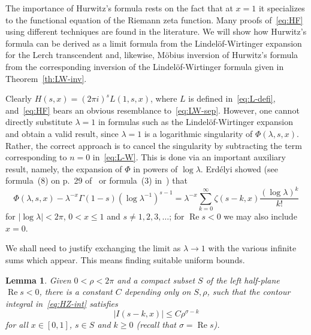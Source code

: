 \documentclass[11pt,a4paper,reqno]{amsart}
\renewcommand{\Re}{\operatorname{Re}}
\theoremstyle{plain}
\newtheorem{lemma}{Lemma}
\theoremstyle{remark}
\numberwithin{equation}{section}
\begin{document}
The importance of Hurwitz's formula rests on the fact that at $x = 1$ it specializes to the functional equation of the Riemann zeta function. Many proofs of~\eqref{eq:HF} using different techniques are found in the literature. We will show how Hurwitz's formula can be derived as a limit formula from the Lindel\"of-Wirtinger expansion for the Lerch transcendent and, likewise, M\"obius inversion of Hurwitz's formula from the corresponding inversion of the Lindel\"of-Wirtinger formula given in Theorem~\ref{th:LW-inv}.

Clearly $H(s,x) = (2\pi i)^{s} L(1,s,x)$, where $L$ is defined in~\eqref{eq:L-defi}, and~\eqref{eq:HF} bears an obvious resemblance to~\eqref{eq:LW-sep}.
However, one cannot directly substitute $\lambda = 1$ in formulas such as the Lindel\"of-Wirtinger expansion and obtain a valid result, since $\lambda = 1$ is a logarithmic singularity of $\Phi(\lambda,s,x)$. Rather, the correct approach is to cancel the singularity by subtracting the term corresponding to $n=0$ in~\eqref{eq:L-W}. This is done via an important auxiliary result, namely, the expansion of $\Phi$ in powers of $\log\lambda$. Erd\'elyi showed (see formula~(8) on p.~29 of~\cite{Bate} or formula~(3) in~\cite{Johnson}) that
%
\begin{equation}
\label{eq:Phi-logser}
  \Phi(\lambda,s,x) - \lambda^{-x} \Gamma(1-s){(\log \lambda^{-1})}^{s-1}
  = \lambda^{-x} \sum_{k=0}^{\infty} \zeta(s-k,x) \frac{(\log\lambda)^{k}}{k!}
\end{equation}
%
for $|\log \lambda| < 2 \pi$, $0 < x \leq 1$ and $s \neq 1,2,3,\dots$; for $\Re s < 0$ we may also include $x = 0$.

We shall need to justify exchanging the limit as $\lambda \to 1$ with the various infinite sums which appear. This means finding suitable uniform bounds.


\begin{lemma}
\label{lemma:int-bd}
Given $0 < \rho < 2 \pi$ and a compact subset $S$ of the left half-plane $\Re s < 0$, there is a constant $C$ depending only on $S,\rho$, such that the contour integral in~\eqref{eq:HZ-int} satisfies
%
\begin{equation}
\label{eq:int-bd}
	|I(s-k,x)| \leq C \rho^{\sigma-k}
\end{equation}
%
for all $x \in [0,1]$, $s \in S$ and $k \geq 0$
(recall that $\sigma = \Re s$).
\end{lemma}
\end{document}
